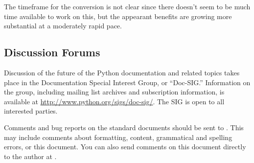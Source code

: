 \documentclass{howto}
\begin{document}
    The timeframe for the conversion is not clear since there doesn't
    seem to be much time available to work on this, but the appearant
    benefits are growing more substantial at a moderately rapid pace.


  \subsection{Discussion Forums \label{discussion}}

    Discussion of the future of the Python documentation and related
    topics takes place in the Documentation Special Interest Group, or
    ``Doc-SIG.''  Information on the group, including mailing list
    archives and subscription information, is available at
    \url{http://www.python.org/sigs/doc-sig/}.  The SIG is open to all
    interested parties.

    Comments and bug reports on the standard documents should be sent
    to .  This may include comments
    about formatting, content, grammatical and spelling errors, or
    this document.  You can also send comments on this document
    directly to the author at .


\end{document}

